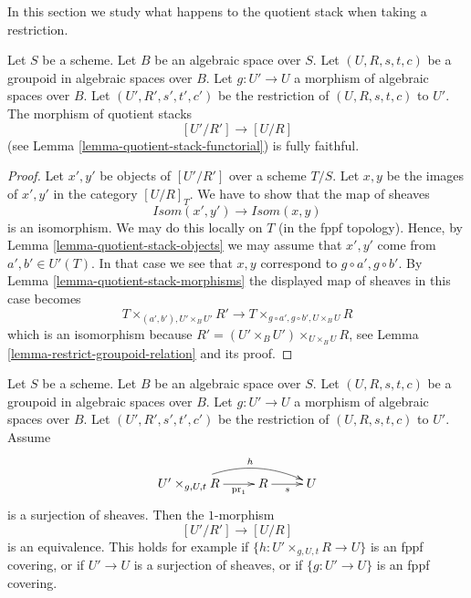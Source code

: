 \noindent
In this section we study what happens to the quotient stack
when taking a restriction.

\begin{lemma}
\label{lemma-quotient-stack-restrict}
Let $S$ be a scheme. Let $B$ be an algebraic space over $S$.
Let $(U, R, s, t, c)$ be a groupoid in algebraic spaces over $B$.
Let $g : U' \to U$ a morphism of algebraic spaces over $B$.
Let $(U', R', s', t', c')$ be the restriction of $(U, R, s, t, c)$ to $U'$. 
The morphism of quotient stacks
$$
[U'/R'] \longrightarrow [U/R]
$$
(see Lemma \ref{lemma-quotient-stack-functorial}) is fully faithful.
\end{lemma}

\begin{proof}
Let $x', y'$ be objects of $[U'/R']$ over a scheme $T/S$.
Let $x, y$ be the images of $x', y'$ in the category $[U/R]_T$.
We have to show that the map of sheaves
$$
\mathit{Isom}(x', y') \longrightarrow \mathit{Isom}(x, y)
$$
is an isomorphism. We may do this locally on $T$ (in the fppf topology).
Hence, by
Lemma \ref{lemma-quotient-stack-objects}
we may assume that $x', y'$ come from $a', b' \in U'(T)$.
In that case we see that $x, y$ correspond to $g \circ a', g \circ b'$. By
Lemma \ref{lemma-quotient-stack-morphisms}
the displayed map of sheaves in this case becomes
$$
T \times_{(a', b'), U' \times_B U'} R'
\longrightarrow
T \times_{g \circ a', g \circ b', U \times_B U} R
$$
which is an isomorphism because
$R' = (U' \times_B U')\times_{U \times_B U} R$, see
Lemma \ref{lemma-restrict-groupoid-relation}
and its proof.
\end{proof}

\begin{lemma}
\label{lemma-quotient-stack-restrict-equivalence}
Let $S$ be a scheme. Let $B$ be an algebraic space over $S$.
Let $(U, R, s, t, c)$ be a groupoid in algebraic spaces over $B$.
Let $g : U' \to U$ a morphism of algebraic spaces over $B$.
Let $(U', R', s', t', c')$ be the restriction of $(U, R, s, t, c)$ to $U'$.
Assume
$$
\xymatrix{
U' \times_{g, U, t} R \ar[r]_-{\text{pr}_1} \ar@/^3ex/[rr]^h
& R \ar[r]_s & U
}
$$
is a surjection of sheaves. Then the $1$-morphism
$$
[U'/R'] \longrightarrow [U/R]
$$
is an equivalence. This holds for example if
$\{h : U' \times_{g, U, t} R \to U\}$ is an fppf covering, or
if $U' \to U$ is a surjection of sheaves, or if
$\{g : U' \to U\}$ is an fppf covering.
\end{lemma}

